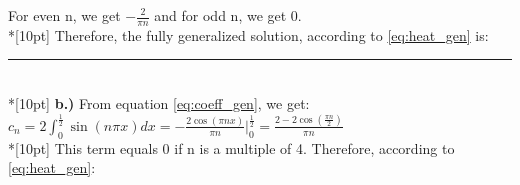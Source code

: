 \documentclass{article}
\begin{document}
For even n, we get \(\displaystyle-\frac{2}{\pi n}\) and for odd n, we get 0.\\*[10pt]
Therefore, the fully generalized solution, according to \eqref{eq:heat_gen} is:
\begin{center}
\end{center}
\rule{\linewidth}{0.2mm}\\*[10pt]
\textbf{b.)} From equation \eqref{eq:coeff_gen}, we get:
\(\displaystyle c_n = 2\int_{0}^{\frac{1}{2}}\sin(n\pi x)dx = -\frac{2\cos(\pi nx)}{\pi n}\Bigg|_{0}^{\frac{1}{2}} = \frac{2 - 2\cos(\frac{\pi n}{2})}{\pi n}\)\\*[10pt]
This term equals 0 if n is a multiple of 4. Therefore, according to \eqref{eq:heat_gen}:
\begin{center}
\end{center}
\clearpage \noindent
\end{document}
